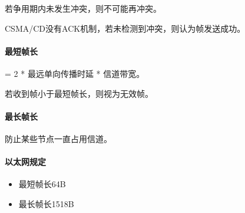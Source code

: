 若争用期内未发生冲突，则不可能再冲突。

CSMA/CD没有ACK机制，若未检测到冲突，则认为帧发送成功。

\paragraph{最短帧长}
= 2 * 最远单向传播时延 * 信道带宽。

若收到帧小于最短帧长，则视为无效帧。

\paragraph{最长帧长}
防止某些节点一直占用信道。

\paragraph{以太网规定}
\begin{itemize}
    \item 最短帧长64B
    \item 最长帧长1518B
\end{itemize}


